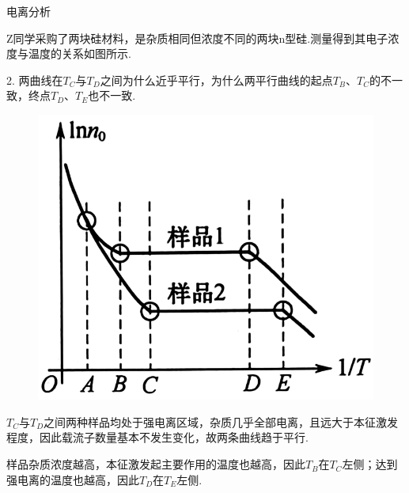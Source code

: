 \documentclass{beamer}
\begin{document}
\begin{frame}[t]{电离分析}

    {
    \kaishu
    \qquad Z同学采购了两块硅材料，是杂质相同但浓度不同的两块n型硅.测量得到其电子浓度与温度的关系如图所示.\par
    2. 两曲线在$T_C$与$T_D$之间为什么近乎平行，为什么两平行曲线的起点$T_B$、$T_C$的不一致，终点$T_D$、$T_E$也不一致.
    } \par
    
    \vspace{0.1cm}
    \begin{figure} %
    \vspace{-0.7cm}
	\begin{center}
		\includegraphics[width=0.93\linewidth]{8.png}
	\end{center}
    \end{figure}
    
    
    \qquad $T_C$与$T_D$之间两种样品均处于强电离区域，杂质几乎全部电离，且远大于本征激发程度，因此载流子数量基本不发生变化，故两条曲线趋于平行.\par
    
    \qquad 样品杂质浓度越高，本征激发起主要作用的温度也越高，因此$T_B$在$T_C$左侧；达到强电离的温度也越高，因此$T_D$在$T_E$左侧.
    
\end{frame}
\end{document}
